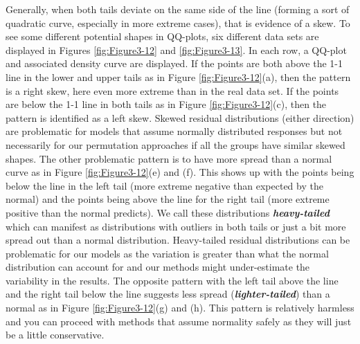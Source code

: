 \documentclass[]{book}
\theoremstyle{definition}
\theoremstyle{definition}
\theoremstyle{remark}
\begin{document}
Generally, when both tails deviate on the same side of the line (forming
a sort of quadratic curve, especially in more extreme cases), that is
evidence of a skew. To see some different potential shapes in QQ-plots,
six different data sets are displayed in Figures \ref{fig:Figure3-12}
and \ref{fig:Figure3-13}. In each row, a QQ-plot and associated density
curve are displayed. If the points are both above the 1-1 line in the
lower and upper tails as in Figure \ref{fig:Figure3-12}(a), then the
pattern is a right skew, here even more extreme than in the real data
set. If the points are below the 1-1 line in both tails as in Figure
\ref{fig:Figure3-12}(c), then the pattern is identified as a left skew.
Skewed residual distributions (either direction) are problematic for
models that assume normally distributed responses but not necessarily
for our permutation approaches if all the groups have similar skewed
shapes. The other problematic pattern is to have more spread than a
normal curve as in Figure \ref{fig:Figure3-12}(e) and (f). This shows up
with the points being below the line in the left tail (more extreme
negative than expected by the normal) and the points being above the
line for the right tail (more extreme positive than the normal
predicts). We call these distributions \textbf{\emph{heavy-tailed}}
which can manifest as distributions with outliers in both tails or just
a bit more spread out than a normal distribution. Heavy-tailed residual
distributions can be problematic for our models as the variation is
greater than what the normal distribution can account for and our
methods might under-estimate the variability in the results. The
opposite pattern with the left tail above the line and the right tail
below the line suggests less spread (\textbf{\emph{lighter-tailed}})
than a normal as in Figure \ref{fig:Figure3-12}(g) and (h). This pattern
is relatively harmless and you can proceed with methods that assume
normality safely as they will just be a little conservative.
\end{document}
